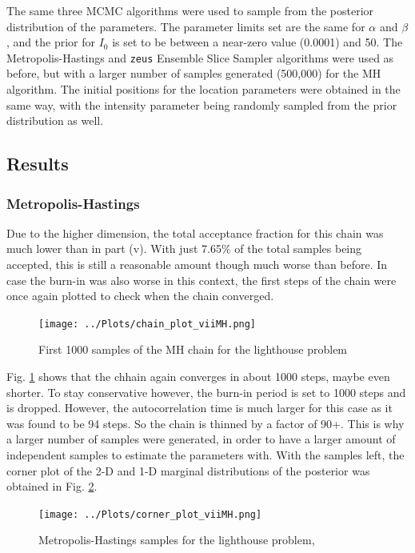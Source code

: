 \documentclass[12pt]{report} %
\begin{document}
The same three MCMC algorithms were used to sample from the posterior distribution of the parameters. The parameter limits set are the same for $\alpha$ and $\beta$, and the prior for $I_{0}$ is set to be between a near-zero value (0.0001) and 50. The Metropolis-Hastings and \texttt{zeus} Ensemble Slice Sampler algorithms were used as before, but with a larger number of samples generated (500,000) for the MH algorithm. The initial positions for the location parameters were obtained in the same way, with the intensity parameter being randomly sampled from the prior distribution as well.

\subsection*{Results}

\subsubsection*{Metropolis-Hastings}

Due to the higher dimension, the total acceptance fraction for this chain was much lower than in part (v). With just 7.65\% of the total samples being accepted, this is still a reasonable amount though much worse than before. In case the burn-in was also worse in this context, the first steps of the chain were once again plotted to check when the chain converged.

\begin{figure}[h]
\centering
\texttt{[image: ../Plots/chain\_plot\_viiMH.png]}
\caption{First 1000 samples of the MH chain for the lighthouse problem}
\label{fig:MH_convergence_vii}
\end{figure}

Fig. \ref{fig:MH_convergence_vii} shows that the chhain again converges in about 1000 steps, maybe even shorter. To stay conservative however, the burn-in period is set to 1000 steps and is dropped. However, the autocorrelation time is much larger for this case as it was found to be 94 steps. So the chain is thinned by a factor of 90+. This is why a larger number of samples were generated, in order to have a larger amount of independent samples to estimate the parameters with. With the samples left, the corner plot of the 2-D and 1-D marginal distributions of the posterior was obtained in Fig. \ref{fig:MH_samples_vii}.

\begin{figure}[h]
\centering
\texttt{[image: ../Plots/corner\_plot\_viiMH.png]}
\caption{Metropolis-Hastings samples for the lighthouse problem, }
\label{fig:MH_samples_vii}
\end{figure}
\end{document}
